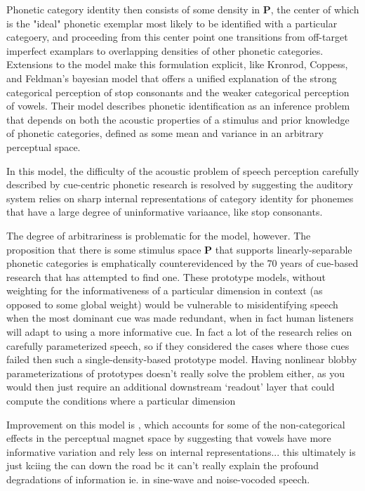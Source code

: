 \begin{multicols}{2}
Phonetic category identity then consists of some density in $\mathbf{P}$, the center of which is the "ideal" phonetic exemplar most likely to be identified with a particular categoery, and proceeding from this center point one transitions from off-target imperfect examplars to overlapping densities of other phonetic categories. Extensions to the model make this formulation explicit, like Kronrod, Coppess, and Feldman's\cite{Kronrod2016a} bayesian model that offers a unified explanation of the strong categorical perception of stop consonants and the weaker categorical perception of vowels. Their model describes phonetic identification as an inference problem that depends on both the acoustic properties of a stimulus and prior knowledge of phonetic categories, defined as some mean and variance in an arbitrary perceptual space. 

In this model, the difficulty of the acoustic problem of speech perception carefully described by cue-centric phonetic research is resolved by suggesting the auditory system relies on sharp internal representations of category identity for phonemes that have a large degree of uninformative variaance, like stop consonants. 

The degree of arbitrariness is problematic for the model, however. The proposition that there is some stimulus space $\mathbf{P}$ that supports linearly-separable phonetic categories is emphatically counterevidenced by the 70 years of cue-based research that has attempted to find one. These prototype models, without weighting for the informativeness of a particular dimension in context (as opposed to some global weight) would be vulnerable to misidentifying speech when the most dominant cue was made redundant, when in fact human listeners will adapt to using a more informative cue. In fact a lot of the research relies on carefully parameterized speech, so if they considered the cases where those cues failed then such a single-density-based prototype model. Having nonlinear blobby parameterizations of prototypes doesn't really solve the problem either, as you would then just require an additional downstream `readout' layer that could compute the conditions where a particular dimension 


Improvement on this model is \cite{Kronrod2016a}, which accounts for some of the non-categorical effects in the perceptual magnet space by suggesting that vowels have more informative variation and rely less on internal representations... this ultimately is just kciing the can down the road bc it can't really explain the profound degradations of information ie. in sine-wave and noise-vocoded speech. 


\end{multicols}
